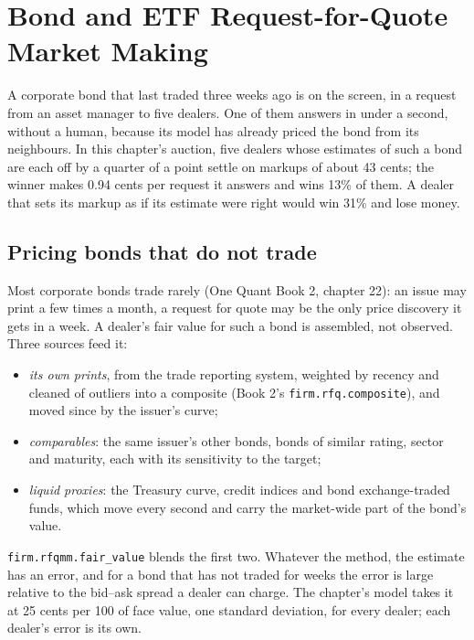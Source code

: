 \chapter{Bond and ETF Request-for-Quote Market Making}\label{ch:hf:bond-and-etf-request-for-quote-market-making}

A corporate bond that last traded three weeks ago is on the screen, in a request from an asset manager to five dealers. One of them answers in
under a second, without a human, because its model has already priced the bond from its neighbours. In this chapter's auction, five dealers whose
estimates of such a bond are each off by a quarter of a point settle on markups of about 43 cents; the winner makes 0.94 cents per request it
answers and wins 13\% of them. A dealer that sets its markup as if its estimate were right would win 31\% and lose money.

\section{Pricing bonds that do not trade}

Most corporate bonds trade rarely (One Quant Book 2, chapter 22): an issue may print a few times a month, a request for quote may be the only price
discovery it gets in a week. A dealer's fair value for such a bond is assembled, not observed. Three sources feed it:

\begin{itemize}
\item \emph{its own prints}, from the trade reporting system, weighted by recency and cleaned of outliers into a composite (Book 2's
\texttt{firm.rfq.composite}), and moved since by the issuer's curve;
\item \emph{comparables}: the same issuer's other bonds, bonds of similar rating, sector and maturity, each with its sensitivity to the target;
\item \emph{liquid proxies}: the Treasury curve, credit indices and bond exchange-traded funds, which move every second and carry the market-wide
part of the bond's value.
\end{itemize}

\texttt{firm.rfqmm.fair\_value} blends the first two. Whatever the method, the estimate has an error, and for a bond that has not traded for weeks
the error is large relative to the bid--ask spread a dealer can charge. The chapter's model takes it at 25 cents per 100 of face value, one standard
deviation, for every dealer; each dealer's error is its own.

